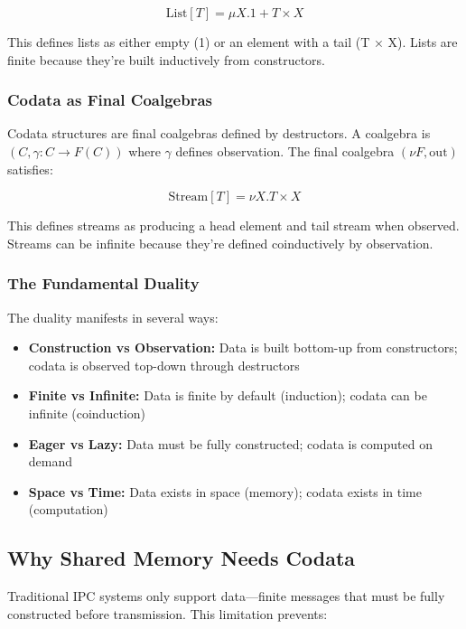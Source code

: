 \documentclass[11pt]{article}
\begin{document}
\begin{equation}
\text{List}[T] = \mu X. 1 + T \times X
\end{equation}

This defines lists as either empty (1) or an element with a tail (T × X). Lists are finite because they're built inductively from constructors.

\subsubsection{Codata as Final Coalgebras}

Codata structures are final coalgebras defined by destructors. A coalgebra is $(C, \gamma: C \to F(C))$ where $\gamma$ defines observation. The final coalgebra $(\nu F, \text{out})$ satisfies:

\begin{equation}
\text{Stream}[T] = \nu X. T \times X
\end{equation}

This defines streams as producing a head element and tail stream when observed. Streams can be infinite because they're defined coinductively by observation.

\subsubsection{The Fundamental Duality}

The duality manifests in several ways:

\begin{itemize}
\item \textbf{Construction vs Observation:} Data is built bottom-up from constructors; codata is observed top-down through destructors
\item \textbf{Finite vs Infinite:} Data is finite by default (induction); codata can be infinite (coinduction)
\item \textbf{Eager vs Lazy:} Data must be fully constructed; codata is computed on demand
\item \textbf{Space vs Time:} Data exists in space (memory); codata exists in time (computation)
\end{itemize}

\subsection{Why Shared Memory Needs Codata}

Traditional IPC systems only support data---finite messages that must be fully constructed before transmission. This limitation prevents:
\end{document}
